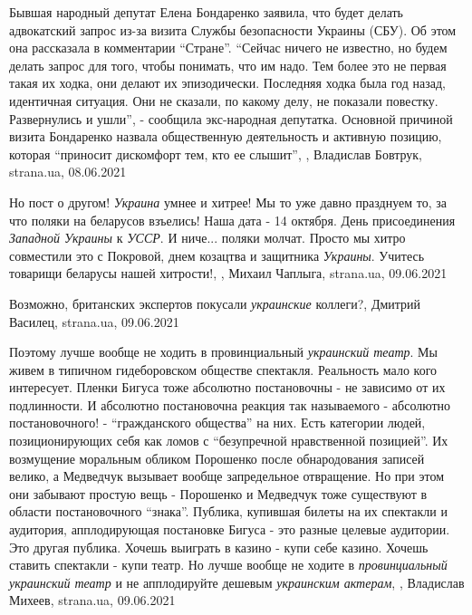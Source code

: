Бывшая народный депутат Елена Бондаренко заявила, что будет делать адвокатский
запрос из-за визита Службы безопасности Украины (СБУ).  Об этом она рассказала
в комментарии \enquote{Стране}.  \enquote{Сейчас ничего не известно, но будем
делать запрос для того, чтобы понимать, что им надо. Тем более это не первая
такая их ходка, они делают их эпизодически. Последняя ходка была год назад,
идентичная ситуация. Они не сказали, по какому делу, не показали повестку.
Развернулись и ушли}, - сообщила экс-народная депутатка.  Основной причиной
визита Бондаренко назвала общественную деятельность и активную позицию, которая
\enquote{приносит дискомфорт тем, кто ее слышит},
, Владислав Бовтрук, strana.ua, 08.06.2021

Но пост о другом! \emph{Украина} умнее и хитрее! Мы то уже давно празднуем то,
за что поляки на беларусов взъелись!  Наша дата - 14 октября. День
присоединения \emph{Западной Украины} к \emph{УССР}. И ниче... поляки молчат.  Просто
мы хитро совместили это с Покровой, днем козацтва и защитника \emph{Украины}.
Учитесь товарищи беларусы нашей хитрости!,
, Михаил Чаплыга, strana.ua, 09.06.2021

Возможно, британских экспертов покусали \emph{украинские} коллеги?, Дмитрий Василец, strana.ua, 09.06.2021

Поэтому лучше вообще не ходить в провинциальный \emph{украинский театр}.  Мы
живем в типичном гидеборовском обществе спектакля. Реальность мало кого
интересует.  Пленки Бигуса тоже абсолютно постановочны - не зависимо от их
подлинности.  И абсолютно постановочна реакция так называемого - абсолютно
постановочного! - \enquote{гражданского общества} на них.  Есть категории
людей, позиционирующих себя как ломов с \enquote{безупречной нравственной
позицией}.  Их возмущение моральным обликом Порошенко после обнародования
записей велико, а Медведчук вызывает вообще запредельное отвращение. Но при
этом они забывают простую вещь - Порошенко и Медведчук тоже существуют в
области постановочного \enquote{знака}.  Публика, купившая билеты на их
спектакли и аудитория, апплодирующая постановке Бигуса - это разные целевые
аудитории. Это другая публика.  Хочешь выиграть в казино - купи себе казино.
Хочешь ставить спектакли - купи театр.  Но лучше вообще не ходите в
\emph{провинциальный украинский театр} и не апплодируйте дешевым
\emph{украинским актерам},
, Владислав Михеев, strana.ua, 09.06.2021

